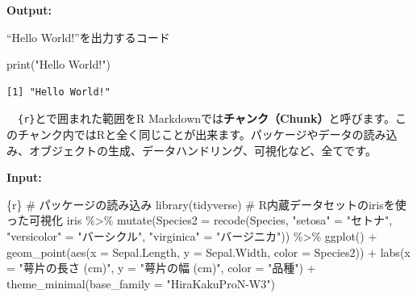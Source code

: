 \documentclass[
  a4paper,
  pandoc,
  ja=standard,
  jafont=haranoaji]{bxjsbook}
\newenvironment{Shaded}{\begin{snugshade}}{\end{snugshade}}
\newcommand{\AttributeTok}[1]{\textcolor[rgb]{0.00,0.48,0.65}{#1}}
\newcommand{\CommentTok}[1]{\textcolor[rgb]{0.37,0.37,0.37}{#1}}
\newcommand{\FunctionTok}[1]{\textcolor[rgb]{0.28,0.35,0.67}{#1}}
\newcommand{\InformationTok}[1]{\textcolor[rgb]{0.37,0.37,0.37}{#1}}
\newcommand{\NormalTok}[1]{\textcolor[rgb]{0.00,0.48,0.65}{#1}}
\newcommand{\OtherTok}[1]{\textcolor[rgb]{0.00,0.48,0.65}{#1}}
\newcommand{\SpecialCharTok}[1]{\textcolor[rgb]{0.37,0.37,0.37}{#1}}
\newcommand{\StringTok}[1]{\textcolor[rgb]{0.13,0.47,0.30}{#1}}
\begin{document}
\textbf{Output:}

``Hello World!''を出力するコード

\begin{Shaded}
\begin{Highlighting}[]
\FunctionTok{print}\NormalTok{(}\StringTok{"Hello World!"}\NormalTok{)}
\end{Highlighting}
\end{Shaded}

\begin{verbatim}
[1] "Hello World!"
\end{verbatim}

　\texttt{\textasciigrave{}\textasciigrave{}\textasciigrave{}\{r\}}と\texttt{\textasciigrave{}\textasciigrave{}\textasciigrave{}}で囲まれた範囲をR
Markdownでは\textbf{チャンク（Chunk）}と呼びます。このチャンク内ではRと全く同じことが出来ます。パッケージやデータの読み込み、オブジェクトの生成、データハンドリング、可視化など、全てです。

\textbf{Input:} 　

\begin{Shaded}
\begin{Highlighting}[]
\InformationTok{\textasciigrave{}\textasciigrave{}\textasciigrave{}\{r\}}
\CommentTok{\# パッケージの読み込み}
\FunctionTok{library}\NormalTok{(tidyverse)}
\CommentTok{\# R内蔵データセットのirisを使った可視化}
\NormalTok{iris }\SpecialCharTok{\%\textgreater{}\%}
  \FunctionTok{mutate}\NormalTok{(}\AttributeTok{Species2 =} \FunctionTok{recode}\NormalTok{(Species,}
                           \StringTok{"setosa"}     \OtherTok{=} \StringTok{"セトナ"}\NormalTok{,}
                           \StringTok{"versicolor"} \OtherTok{=} \StringTok{"バーシクル"}\NormalTok{,}
                           \StringTok{"virginica"}  \OtherTok{=} \StringTok{"バージニカ"}\NormalTok{)) }\SpecialCharTok{\%\textgreater{}\%}
  \FunctionTok{ggplot}\NormalTok{() }\SpecialCharTok{+}
  \FunctionTok{geom\_point}\NormalTok{(}\FunctionTok{aes}\NormalTok{(}\AttributeTok{x =}\NormalTok{ Sepal.Length, }\AttributeTok{y =}\NormalTok{ Sepal.Width, }\AttributeTok{color =}\NormalTok{ Species2)) }\SpecialCharTok{+}
  \FunctionTok{labs}\NormalTok{(}\AttributeTok{x =} \StringTok{"萼片の長さ (cm)"}\NormalTok{, }\AttributeTok{y =} \StringTok{"萼片の幅 (cm)"}\NormalTok{, }\AttributeTok{color =} \StringTok{"品種"}\NormalTok{) }\SpecialCharTok{+}
  \FunctionTok{theme\_minimal}\NormalTok{(}\AttributeTok{base\_family =} \StringTok{"HiraKakuProN{-}W3"}\NormalTok{)}
\InformationTok{\textasciigrave{}\textasciigrave{}\textasciigrave{}}
\end{Highlighting}
\end{Shaded}
\end{document}
